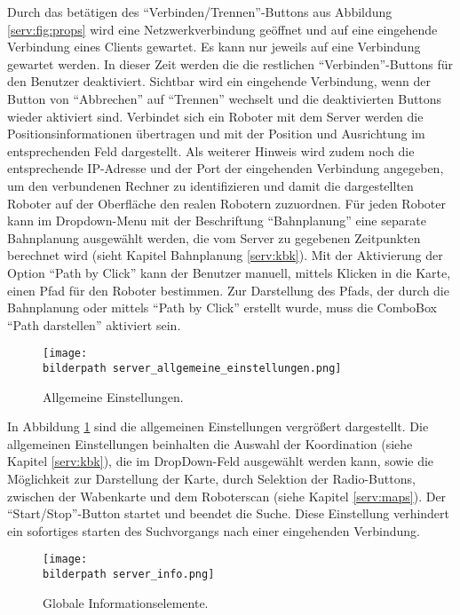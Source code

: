 Durch das betätigen des "`Verbinden/Trennen"'-Buttons aus Abbildung \ref{serv:fig:props} wird eine Netzwerkverbindung geöffnet und auf eine eingehende Verbindung eines Clients gewartet. Es kann nur jeweils auf eine Verbindung gewartet werden. In dieser Zeit werden die die restlichen "`Verbinden"'-Buttons für den Benutzer deaktiviert. Sichtbar wird ein eingehende Verbindung, wenn der Button von "`Abbrechen"' auf "`Trennen"' wechselt und die deaktivierten Buttons wieder aktiviert sind. Verbindet sich ein Roboter mit dem Server werden die Positionsinformationen übertragen und mit der Position und Ausrichtung im entsprechenden Feld dargestellt. Als weiterer Hinweis wird zudem noch die entsprechende IP-Adresse und der Port der eingehenden Verbindung angegeben, um den verbundenen Rechner zu identifizieren und damit die dargestellten Roboter auf der Oberfläche den realen Robotern zuzuordnen. Für jeden Roboter kann im Dropdown-Menu mit der Beschriftung "`Bahnplanung"' eine separate Bahnplanung ausgewählt werden, die vom Server zu gegebenen Zeitpunkten berechnet wird (sieht Kapitel Bahnplanung \ref{serv:kbk}). Mit der Aktivierung der Option "`Path by Click"' kann der Benutzer manuell, mittels Klicken in die Karte, einen Pfad für den Roboter bestimmen. Zur Darstellung des Pfads, der durch die Bahnplanung oder mittels "`Path by Click"' erstellt wurde, muss die ComboBox "`Path darstellen"' aktiviert sein.\\ 

\begin{figure}[h]
	\centering	
	\texttt{[image: \\bilderpath server\_allgemeine\_einstellungen.png]}
	\caption{Allgemeine Einstellungen.}
	\label{serv:fig:general}
\end{figure}

In Abbildung \ref{serv:fig:general} sind die allgemeinen Einstellungen vergrößert dargestellt. Die allgemeinen Einstellungen beinhalten die Auswahl der Koordination (siehe Kapitel \ref{serv:kbk}), die im DropDown-Feld ausgewählt werden kann, sowie die Möglichkeit zur Darstellung der Karte, durch Selektion der Radio-Buttons, zwischen der Wabenkarte und dem Roboterscan (siehe Kapitel \ref{serv:maps}). Der "`Start/Stop"'-Button startet und beendet die Suche. Diese Einstellung verhindert ein sofortiges starten des Suchvorgangs nach einer eingehenden Verbindung.

\begin{figure}[h]
	\centering	
	\texttt{[image: \\bilderpath server\_info.png]}
	\caption{Globale Informationselemente.}
	\label{serv:fig:info}
\end{figure}

